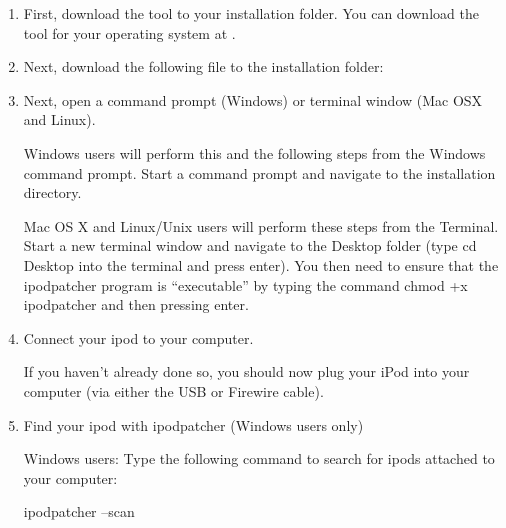\begin{enumerate} 

  \item First, download the  tool to your installation 
  folder.  You can download the  tool for your operating 
  system at .
  
  \item Next, download the following file to the installation folder: 


  \item Next, open a command prompt (Windows) or terminal window (Mac OSX and Linux).
  
    Windows users will perform this and the following steps from the Windows 
    command prompt. Start a command prompt and navigate to the installation 
    directory.

    Mac OS X and Linux/Unix users will perform these steps from the Terminal. 
    Start a new terminal window and navigate to the Desktop folder (type cd 
    Desktop into the terminal and press enter). You then need to ensure that the 
    ipodpatcher program is ``executable'' by typing the command chmod +x 
    ipodpatcher and then pressing enter.
  
  \item Connect your ipod to your computer.

    If you haven't already done so, you should now plug your iPod into your 
    computer (via either the USB or Firewire cable).


  \item Find your ipod with ipodpatcher (Windows users only)

    Windows users:  Type the following command to search for ipods attached to 
    your computer: 
      \begin{code} 
        ipodpatcher --scan 
      \end{code}
    

\end{enumerate}
